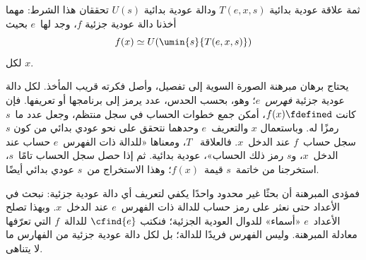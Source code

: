 \documentclass[../../../include/open-logic-section]{subfiles}
\begin{document}

\begin{thm}
ثمة علاقة عودية بدائية $T(e,x,s)$ ودالة عودية بدائية $U(s)$ تحققان
هذا الشرط: مهما أخذنا دالة عودية جزئية $f$، وجد لها~$e$ بحيث
\[
f(x) \simeq U(\umin{s}{T(e, x, s)})
\]
لكل $x$.
\end{thm}

\begin{explain}
يحتاج برهان مبرهنة الصورة السوية إلى تفصيل، وأصل فكرته قريب المأخذ. لكل دالة
عودية جزئية \emph{فهرس}~$e$؛ وهو، بحسب الحدس، عدد يرمز إلى برنامجها أو تعريفها.
فإن كانت $f(x)\fdefined$، أمكن جمع خطوات الحساب في سجل منتظم، وجعل عدد
ما~$s$ رمزًا له. وباستعمال $x$ والتعريف~$e$
وحدهما نتحقق على نحو عودي بدائي من كون $s$ سجل حساب~$f$ عند الدخل~$x$. فالعلاقة
~$T$، ومعناها «للدالة ذات الفهرس~$e$ حساب عند الدخل~$x$، و$s$ رمز
ذلك الحساب»، عودية بدائية. ثم إذا حصل سجل الحساب تامًا~$s$، استخرجنا
من خاتمة~$s$ قيمة~$f(x)$؛ وهذا الاستخراج من~$s$ عودي
بدائي أيضًا.

فمؤدى المبرهنة أن بحثًا غير محدود واحدًا يكفي
لتعريف أي دالة عودية جزئية: نبحث في الأعداد حتى نعثر
على رمز حساب للدالة ذات الفهرس~$e$ عند الدخل~$x$. وبهذا
تصلح الأعداد~$e$ «أسماء» للدوال العودية الجزئية؛ فنكتب $\cfind{e}$
للدالة~$f$ التي تعرّفها معادلة المبرهنة. وليس الفهرس فريدًا
للدالة؛ بل لكل دالة عودية جزئية من الفهارس ما لا
يتناهى.
\end{explain}
\end{document}
